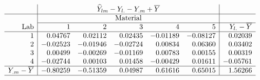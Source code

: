 \begin{table}[tbp]
\begin{center}
$
\begin{array}{r | rrrrr | r}
    & \multicolumn{5}{c|}{\widehat Y_{lm} - Y_{l.} - Y_{.m} + \overline Y} & \\
\hline
    &	\multicolumn{5}{c|}{\mbox{Material}} & \\
	\cline{2-7}
\mbox{Lab}	  &	   1&	    2&	     3&       4&       5 & Y_{l.}-\overline Y \\
\hline
1		  &  0.04767& 0.02112& 0.02435&-0.01189&-0.08127 & 0.02039\\
2		  & -0.02523&-0.01946&-0.02724& 0.00834& 0.06360 & 0.03402\\
3		  &  0.00499&-0.00269&-0.01169& 0.00783& 0.00155 & 0.00319\\
4		  & -0.02744& 0.00103& 0.01458&-0.00429& 0.01611 &-0.05761\\
\hline
Y_{.m}-\overline Y& -0.80259&-0.51359& 0.04987& 0.61616& 0.65015 & 1.56266\\
\hline
\end{array}
$
\end{center}
\mbox{}\hrulefill\mbox{}
\end{table}

